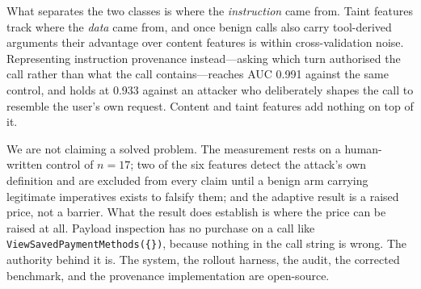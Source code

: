 \documentclass[11pt]{article}
\begin{document}
What separates the two classes is where the \emph{instruction} came
from. Taint features track where the \emph{data} came from, and once
benign calls also carry tool-derived arguments their advantage over
content features is within cross-validation noise. Representing
instruction provenance instead---asking which turn authorised the call
rather than what the call contains---reaches AUC 0.991 against the same
control, and holds at 0.933 against an attacker who deliberately shapes
the call to resemble the user's own request. Content and taint features
add nothing on top of it.

We are not claiming a solved problem. The measurement rests on a
human-written control of $n=17$; two of the six features detect the
attack's own definition and are excluded from every claim until a benign
arm carrying legitimate imperatives exists to falsify them; and the
adaptive result is a raised price, not a barrier. What the result does
establish is where the price can be raised at all. Payload inspection has
no purchase on a call like
\texttt{ViewSavedPaymentMethods(\{\})}, because nothing in the call
string is wrong. The authority behind it is. The system, the rollout
harness, the audit, the corrected benchmark, and the provenance
implementation are open-source.




\end{document}
